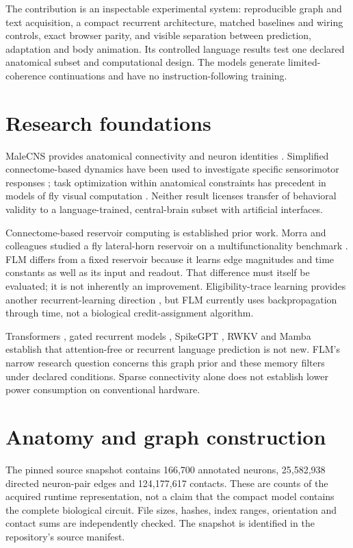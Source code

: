 \documentclass[10pt]{article}
\begin{document}
The contribution is an inspectable experimental system: reproducible graph and text acquisition, a compact recurrent architecture, matched baselines and wiring controls, exact browser parity, and visible separation between prediction, adaptation and body animation. Its controlled language results test one declared anatomical subset and computational design. The models generate limited-coherence continuations and have no instruction-following training.

\section{Research foundations}
MaleCNS provides anatomical connectivity and neuron identities \cite{malecns,google}. Simplified connectome-based dynamics have been used to investigate specific sensorimotor responses \cite{shiu}; task optimization within anatomical constraints has precedent in models of fly visual computation \cite{lappalainen}. Neither result licenses transfer of behavioral validity to a language-trained, central-brain subset with artificial interfaces.

Connectome-based reservoir computing is established prior work. Morra and colleagues studied a fly lateral-horn reservoir on a multifunctionality benchmark \cite{morra}. FLM differs from a fixed reservoir because it learns edge magnitudes and time constants as well as its input and readout. That difference must itself be evaluated; it is not inherently an improvement. Eligibility-trace learning provides another recurrent-learning direction \cite{bellec}, but FLM currently uses backpropagation through time, not a biological credit-assignment algorithm.

Transformers \cite{attention}, gated recurrent models \cite{gru}, SpikeGPT \cite{spikegpt}, RWKV \cite{rwkv} and Mamba \cite{mamba} establish that attention-free or recurrent language prediction is not new. FLM's narrow research question concerns this graph prior and these memory filters under declared conditions. Sparse connectivity alone does not establish lower power consumption on conventional hardware.

\section{Anatomy and graph construction}
The pinned source snapshot contains 166,700 annotated neurons, 25,582,938 directed neuron-pair edges and 124,177,617 contacts. These are counts of the acquired runtime representation, not a claim that the compact model contains the complete biological circuit. File sizes, hashes, index ranges, orientation and contact sums are independently checked. The snapshot is identified in the repository's source manifest.
\end{document}
